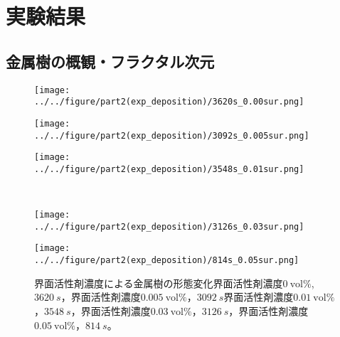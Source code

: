 \documentclass[autodetect-engine,dvi=dvipdfmx,a4paper,ja=standard,oneside,openany,11pt]{bxjsbook}
\begin{document}
\section{実験結果}
\subsection{金属樹の概観・フラクタル次元}

\begin{figure}[htbp]
  \begin{minipage}
    {0.32\textwidth}
    \subcaption{}
    \centering
    \texttt{[image: ../../figure/part2(exp\_deposition)/3620s\_0.00sur.png]}
    \label{fig:non_surfactant}
  \end{minipage}
  \begin{minipage}
    {0.32\textwidth}
    \subcaption{}
    \centering
    \texttt{[image: ../../figure/part2(exp\_deposition)/3092s\_0.005sur.png]}
    \label{fig:0.005_surfactant}
  \end{minipage}
  \begin{minipage}
    {0.32\textwidth}
    \subcaption{}
    \centering
    \texttt{[image: ../../figure/part2(exp\_deposition)/3548s\_0.01sur.png]}
    \label{fig:0.01_surfactant}
  \end{minipage}
  \\
  \begin{minipage}
    {0.32\textwidth}
    \subcaption{}
    \centering
    \texttt{[image: ../../figure/part2(exp\_deposition)/3126s\_0.03sur.png]}
    \label{fig:0.03_surfactant}
  \end{minipage}
  \begin{minipage}
    {0.32\textwidth}
    \subcaption{}
    \centering
    \texttt{[image: ../../figure/part2(exp\_deposition)/814s\_0.05sur.png]}
    \label{fig:0.05_surfactant}
  \end{minipage}
  \caption{界面活性剤濃度による金属樹の形態変化界面活性剤濃度$\SI{0}{\mathrm{vol}\%}$,$\SI{3620}{s}$，界面活性剤濃度$\SI{0.005}{\mathrm{vol}\%}$，$\SI{3092}{s}$界面活性剤濃度$\SI{0.01}{\mathrm{vol}\%}$，$\SI{3548}{s}$，界面活性剤濃度$\SI{0.03}{\mathrm{vol}\%}$，$\SI{3126}{s}$，界面活性剤濃度$\SI{0.05}{\mathrm{vol}\%}$，$\SI{814}{s}$。}
  \label{fig:surfactant}
\end{figure}
\end{document}
